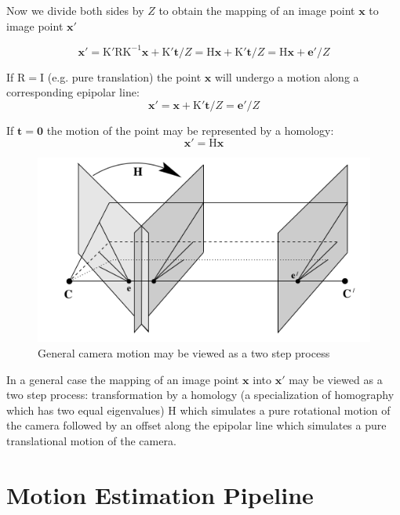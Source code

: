 \documentclass[runningheads]{llncs}
\begin{document}
Now we divide both sides by $Z$ to obtain the mapping of an image point $\mathbf{x}$ to image point $\mathbf{x}'$

\begin{equation}
  \label{eq:point_motion}
  \mathbf{x}' = \mathrm{K'RK^{-1}}\mathbf{x} + \mathrm{K'}\mathbf{t}/Z = \mathrm{H}\mathbf{x}+ \mathrm{K'}\mathbf{t}/Z = \mathrm{H}\mathbf{x} + \mathbf{e'}/Z
\end{equation}

If $\mathrm{R = I}$ (e.g. pure translation) the point $\mathbf{x}$ will undergo a motion along a corresponding epipolar line:
\begin{equation}
\mathbf{x}' = \mathbf{x}+ \mathrm{K'}\mathbf{t}/Z = \mathbf{e}'/Z
\end{equation}

If $\mathbf{t} = \mathbf{0}$ the motion of the point may be represented by a homology:
\[
\mathbf{x}' = \mathrm{H}\mathbf{x}
\]

\begin{figure}[h]
\includegraphics[scale=.3]{general_camera_motion}
\centering
\caption{General camera motion may be viewed as a two step process}
\end{figure}

In a general case the mapping of an image point $\mathbf{x}$ into $\mathbf{x}'$ may be viewed as a two step process: transformation by a homology (a specialization of homography which has two equal eigenvalues) $\mathrm{H}$ which simulates a pure rotational motion of the camera followed by an offset along the epipolar line which simulates a pure translational motion of the camera.

\section{Motion Estimation Pipeline}
\end{document}
